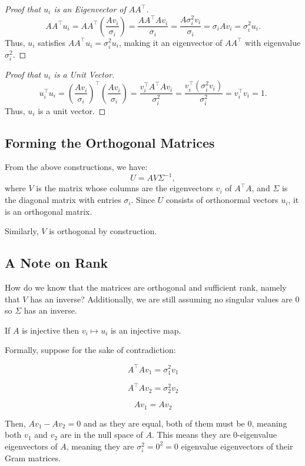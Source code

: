 \documentclass{article}
\begin{document}
\begin{proof}[Proof that \( u_i \) is an Eigenvector of \( A A^\top \)]
\[
A A^\top u_i = A A^\top \left( \dfrac{A v_i}{\sigma_i} \right) = \dfrac{A A^\top A v_i}{\sigma_i} = \dfrac{A \sigma_i^2 v_i}{\sigma_i} = \sigma_i A v_i = \sigma_i^2 u_i.
\]
Thus, \( u_i \) satisfies \( A A^\top u_i = \sigma_i^2 u_i \), making it an eigenvector of \( A A^\top \) with eigenvalue \( \sigma_i^2 \).
\end{proof}

\begin{proof}[Proof that \( u_i \) is a Unit Vector]
\[
u_i^\top u_i = \left( \dfrac{A v_i}{\sigma_i} \right)^\top \left( \dfrac{A v_i}{\sigma_i} \right) = \dfrac{v_i^\top A^\top A v_i}{\sigma_i^2} = \dfrac{v_i^\top (\sigma_i^2 v_i)}{\sigma_i^2} = v_i^\top v_i = 1.
\]
Thus, \( u_i \) is a unit vector.
\end{proof}

\subsection{Forming the Orthogonal Matrices}

From the above constructions, we have:
\[
U = A V \Sigma^{-1},
\]
where \( V \) is the matrix whose columns are the eigenvectors \( v_i \) of \( A^\top A \), and \( \Sigma \) is the diagonal matrix with entries \( \sigma_i \). Since \( U \) consists of orthonormal vectors \( u_i \), it is an orthogonal matrix.

Similarly, \( V \) is orthogonal by construction.

\subsection{A Note on Rank}

How do we know that the matrices are orthogonal and sufficient rank, namely that $V$ has an inverse? Additionally, we are still assuming no singular values are 0 so $\Sigma$ has an inverse.

If $A$ is injective then $v_i \mapsto u_i$ is an injective map. 

Formally, suppose for the sake of contradiction:

$$A^\top A v_1 = \sigma_1^2 v_1$$

$$A^\top A v_2 = \sigma_2^2 v_2$$

$$A v_1 = A v_2$$

Then, $Av_1 - Av_2 = 0$ and as they are equal, both of them must be 0, meaning both $v_1$ and $v_2$ are in the null space of $A$. This means they are 0-eigenvalue eigenvectors of $A$, meaning they are $\sigma_i^2 = 0^2 = 0$ eigenvalue eigenvectors of their Gram matrices.
\end{document}
